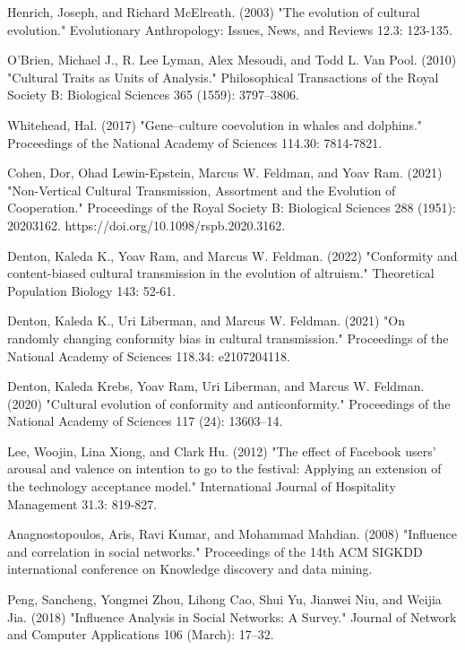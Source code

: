 \documentclass[12pt]{extarticle}
\begin{document}
\begin{thebibliography}{}
Henrich, Joseph, and Richard McElreath. (2003) "The evolution of cultural evolution." Evolutionary Anthropology: Issues, News, and Reviews 12.3: 123-135.

O’Brien, Michael J., R. Lee Lyman, Alex Mesoudi, and Todd L. Van Pool. (2010) "Cultural Traits as Units of Analysis." Philosophical Transactions of the Royal Society B: Biological Sciences 365 (1559): 3797–3806.

Whitehead, Hal. (2017) "Gene–culture coevolution in whales and dolphins." Proceedings of the National Academy of Sciences 114.30: 7814-7821.

Cohen, Dor, Ohad Lewin-Epstein, Marcus W. Feldman, and Yoav Ram. (2021) "Non-Vertical Cultural Transmission, Assortment and the Evolution of Cooperation." Proceedings of the Royal Society B: Biological Sciences 288 (1951): 20203162. https://doi.org/10.1098/rspb.2020.3162.

Denton, Kaleda K., Yoav Ram, and Marcus W. Feldman. (2022) "Conformity and content-biased cultural transmission in the evolution of altruism." Theoretical Population Biology 143: 52-61.

Denton, Kaleda K., Uri Liberman, and Marcus W. Feldman. (2021) "On randomly changing conformity bias in cultural transmission." Proceedings of the National Academy of Sciences 118.34: e2107204118.

Denton, Kaleda Krebs, Yoav Ram, Uri Liberman, and Marcus W. Feldman. (2020) "Cultural evolution of conformity and anticonformity." Proceedings of the National Academy of Sciences 117 (24): 13603–14. 

Lee, Woojin, Lina Xiong, and Clark Hu. (2012) "The effect of Facebook users’ arousal and valence on intention to go to the festival: Applying an extension of the technology acceptance model." International Journal of Hospitality Management 31.3: 819-827.

Anagnostopoulos, Aris, Ravi Kumar, and Mohammad Mahdian. (2008) "Influence and correlation in social networks." Proceedings of the 14th ACM SIGKDD international conference on Knowledge discovery and data mining.

Peng, Sancheng, Yongmei Zhou, Lihong Cao, Shui Yu, Jianwei Niu, and Weijia Jia. (2018) "Influence Analysis in Social Networks: A Survey." Journal of Network and Computer Applications 106 (March): 17–32. 


\end{thebibliography}
\end{document}
